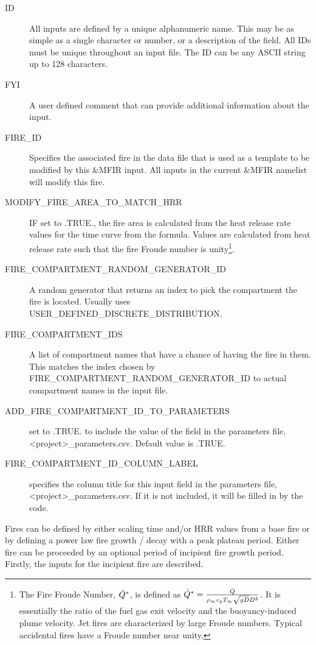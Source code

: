 \documentclass[12pt,twoside]{book}
\begin{document}
\begin{description}
  \item[ID] All inputs are defined by a unique alphanumeric name. This may be as simple as a single character or number, or a description of the field. All IDs must be unique throughout an input file. The { \ct ID} can be any ASCII string up to 128 characters.
  \item[FYI] A user defined comment that can provide additional information about the input.
  \item[FIRE\_ID] Specifies the associated fire in the data file that is used as a template to be modified by this {\ct \&MFIR} input. All inputs in the current {\ct \&MFIR} namelist will modify this fire.
  \item[MODIFY\_FIRE\_AREA\_TO\_MATCH\_HRR] IF set to {\ct .TRUE.}, the fire area is calculated from the heat release rate values for the time curve from the formula. Values are calculated from heat release rate such that the fire Froude number is unity\footnote{The Fire Froude Number, $\dot{Q}^*$, is defined as $\dot{Q}^* = \frac{\dot{Q}}{\rho_\infty c_p T_\infty \sqrt{gD} D^2}$. It is essentially the ratio of the fuel gas exit velocity and the buoyancy-induced plume velocity. Jet fires are characterized by large Froude numbers. Typical accidental fires have a Froude number near unity.}.
  \item[FIRE\_COMPARTMENT\_RANDOM\_GENERATOR\_ID] A random generator that returns an index to pick the compartment the fire is located. Usually uses \\
      {\ct USER\_DEFINED\_DISCRETE\_DISTRIBUTION}.
  \item[FIRE\_COMPARTMENT\_IDS] A list of compartment names that have a chance of having the fire in them. This matches the index chosen by {\ct FIRE\_COMPARTMENT\_RANDOM\_GENERATOR\_ID} to actual compartment names in the input file.
  \item[ADD\_FIRE\_COMPARTMENT\_ID\_TO\_PARAMETERS] set to .TRUE. to include the value of the field in the parameters file, {\ct <project>\_parameters.csv}. Default value is .TRUE.
  \item[FIRE\_COMPARTMENT\_ID\_COLUMN\_LABEL] specifies the column title for this input field in the parameters file, {\ct <project>\_parameters.csv}. If it is not included, it will be filled in by the code.
  \end{description}
Fires can be defined by either scaling time and/or HRR values from a base fire or by defining a power law fire growth / decay with a peak plateau period. Either fire can be proceeded by an optional period of incipient fire growth period. Firstly, the inputs for the incipient fire are described.
\end{document}
